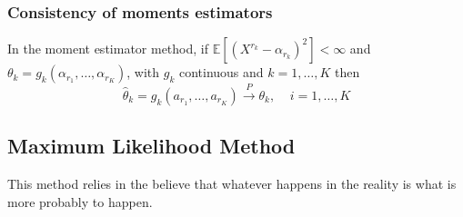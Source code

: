 \subsubsection{Consistency of moments estimators}
In the moment estimator method, if $\mathbb{E}[(X^{r_k}-\alpha_{r_k})^2]<\infty$
and $\theta_k=g_k(\alpha_{r_1},\dots,\alpha_{r_K})$, with $g_k$ continuous and
$k=1,\dots,K$ then
\[ \hat{\theta}_k = g_k(a_{r_1},\dots,a_{r_K})\xrightarrow{P}\theta_k, \;\;\;\;
i=1,\dots,K \]

\subsection{Maximum Likelihood Method}
This method relies in the believe that whatever happens in the reality is what is more
probably to happen.

